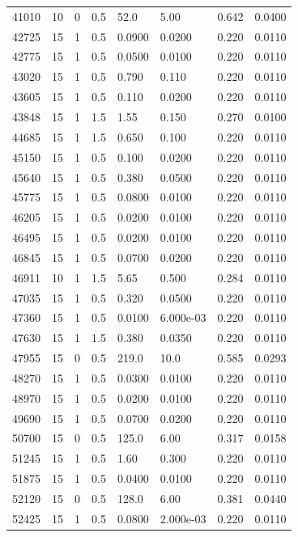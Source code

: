 \documentclass[preview]{standalone}
\begin{document}
{{{\begin{tabular}{L{1.2cm}C{1.2cm} C{0.3cm}C{0.5cm} C{1.4cm}C{1.4cm} C{1.4cm}C{1.4cm}}
  41010  &    10  & 0     & 0.5 &  52.0  & 5.00  & 0.642 &  0.0400   \\ 
  42725  &    15  & 1     & 0.5 &  0.0900  & 0.0200  & 0.220 &  0.0110   \\ 
  42775  &    15  & 1     & 0.5 &  0.0500  & 0.0100  & 0.220 &  0.0110   \\ 
  43020  &    15  & 1     & 0.5 &  0.790  & 0.110  & 0.220 &  0.0110   \\ 
  43605  &    15  & 1     & 0.5 &  0.110  & 0.0200  & 0.220 &  0.0110   \\ 
  43848  &    15  & 1     & 1.5 &  1.55  & 0.150  & 0.270 &  0.0100   \\ 
  44685  &    15  & 1     & 1.5 &  0.650  & 0.100  & 0.220 &  0.0110   \\ 
  45150  &    15  & 1     & 0.5 &  0.100  & 0.0200  & 0.220 &  0.0110   \\ 
  45640  &    15  & 1     & 0.5 &  0.380  & 0.0500  & 0.220 &  0.0110   \\ 
  45775  &    15  & 1     & 0.5 &  0.0800  & 0.0100  & 0.220 &  0.0110   \\ 
  46205  &    15  & 1     & 0.5 &  0.0200  & 0.0100  & 0.220 &  0.0110   \\ 
  46495  &    15  & 1     & 0.5 &  0.0200  & 0.0100  & 0.220 &  0.0110   \\ 
  46845  &    15  & 1     & 0.5 &  0.0700  & 0.0200  & 0.220 &  0.0110   \\ 
  46911  &    10  & 1     & 1.5 &  5.65  & 0.500  & 0.284 &  0.0110   \\ 
  47035  &    15  & 1     & 0.5 &  0.320  & 0.0500  & 0.220 &  0.0110   \\ 
  47360  &    15  & 1     & 0.5 &  0.0100  & 6.000e-03  & 0.220 &  0.0110   \\ 
  47630  &    15  & 1     & 1.5 &  0.380  & 0.0350  & 0.220 &  0.0110   \\ 
  47955  &    15  & 0     & 0.5 &  219.0  & 10.0  & 0.585 &  0.0293   \\ 
  48270  &    15  & 1     & 0.5 &  0.0300  & 0.0100  & 0.220 &  0.0110   \\ 
  48970  &    15  & 1     & 0.5 &  0.0200  & 0.0100  & 0.220 &  0.0110   \\ 
  49690  &    15  & 1     & 0.5 &  0.0700  & 0.0200  & 0.220 &  0.0110   \\ 
  50700  &    15  & 0     & 0.5 &  125.0  & 6.00  & 0.317 &  0.0158   \\ 
  51245  &    15  & 1     & 0.5 &  1.60  & 0.300  & 0.220 &  0.0110   \\ 
  51875  &    15  & 1     & 0.5 &  0.0400  & 0.0100  & 0.220 &  0.0110   \\ 
  52120  &    15  & 0     & 0.5 &  128.0  & 6.00  & 0.381 &  0.0440   \\ 
  52425  &    15  & 1     & 0.5 &  0.0800  & 2.000e-03  & 0.220 &  0.0110   \\ 
\hline 
\end{tabular} 

}}}
\end{document}
